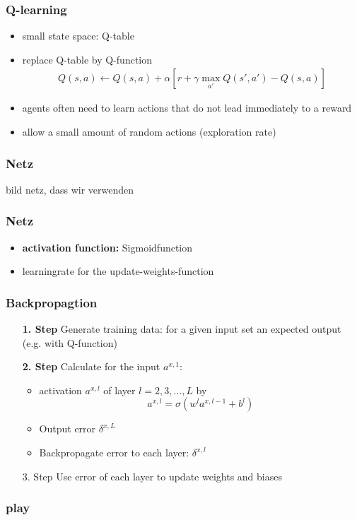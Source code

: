 \documentclass{beamer}
\begin{document}
  \begin{frame}
  \frametitle{Q-learning}
 \begin{itemize}
 \item small state space: Q-table
  \item replace Q-table by Q-function 
  \begin{align}
  Q(s,a) \leftarrow Q(s,a)+\alpha [r+\gamma \max_{a'} Q(s',a') -Q(s,a)]
  \end{align}
 \item agents often need to learn actions that do not lead immediately to a reward
 \item allow a small amount of random actions (exploration rate)
 \end{itemize}
 \end{frame}
 
 \begin{frame}
 \frametitle{Netz}
 bild netz, dass wir verwenden
 \end{frame}
  \begin{frame}
 \frametitle{Netz}
\begin{itemize}
\item \textbf{activation function:} Sigmoidfunction
\item learningrate for the update-weights-function
\end{itemize}
 \end{frame}
 
 \begin{frame}
 \frametitle{Backpropagtion}
 \begin{itemize}
 \item[\textbf{1. Step}] Generate training data: for a given input set an expected output (e.g. with Q-function)
 \item[\textbf{2. Step}] Calculate for the input $a^{x,1}$:
 \begin{itemize}
 \item activation $a^{x,l}$ of layer $l=2,3,...,L$ by
 $$a^{x,l} = \sigma(w^l a^{x,l-1} + b^l)$$
 \item Output error $\delta^{x,L}$
 \item Backpropagate error to each layer: $\delta^{x,l}$
 \end{itemize}
 \item[3. Step] Use error of each layer to update weights and biases 
 \end{itemize}
 \end{frame}
 
 \begin{frame}
 \frametitle{play}
 
 \end{frame}
 
\end{document}
